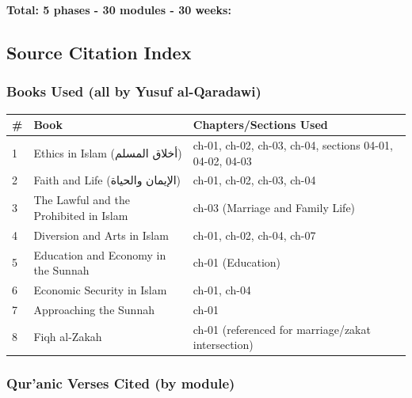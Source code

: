 \documentclass[11pt,a4paper]{article}
\begin{document}
\textbf{Total: 5 phases - 30 modules - 30 weeks:} 

\vspace{6pt}\noindent{\color{border}\rule{\textwidth}{0.5pt}}\vspace{6pt}

\subsection*{Source Citation Index}

\subsubsection*{Books Used (all by Yusuf al-Qaradawi)}

\begin{longtable}{|p{2cm}|p{5cm}|p{8.5cm}|}
\hline
\textbf{\color{accent}\#} & \textbf{\color{accent}Book} & \textbf{\color{accent}Chapters/Sections Used} \\
\hline
1 & Ethics in Islam (أخلاق المسلم) & ch-01, ch-02, ch-03, ch-04, sections 04-01, 04-02, 04-03 \\
\hline
2 & Faith and Life (الإيمان والحياة) & ch-01, ch-02, ch-03, ch-04 \\
\hline
3 & The Lawful and the Prohibited in Islam & ch-03 (Marriage and Family Life) \\
\hline
4 & Diversion and Arts in Islam & ch-01, ch-02, ch-04, ch-07 \\
\hline
5 & Education and Economy in the Sunnah & ch-01 (Education) \\
\hline
6 & Economic Security in Islam & ch-01, ch-04 \\
\hline
7 & Approaching the Sunnah & ch-01 \\
\hline
8 & Fiqh al-Zakah & ch-01 (referenced for marriage/zakat intersection) \\
\hline
\end{longtable}

\subsubsection*{Qur'anic Verses Cited (by module)}
\end{document}
